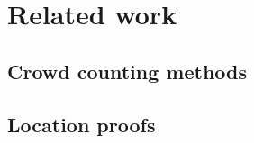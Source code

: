 \section{Related work}%
\label{related-work}

\subsection{Crowd counting methods}


\subsection{Location proofs}


